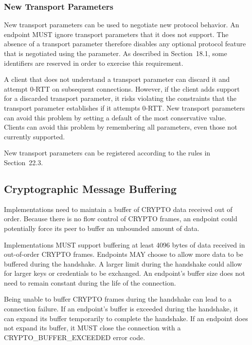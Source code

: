 \documentclass{article}
\begin{document}
\subsubsection{New Transport Parameters}

New transport parameters can be used to negotiate new protocol behavior.  An endpoint MUST ignore transport parameters that it does not support.  The absence of a transport parameter therefore disables any optional protocol feature that is negotiated using the parameter. As described in Section~18.1, some identifiers are reserved in order to exercise this requirement.

A client that does not understand a transport parameter can discard it and attempt 0-RTT on subsequent connections.  However, if the client adds support for a discarded transport parameter, it risks violating the constraints that the transport parameter establishes if it attempts 0-RTT.  New transport parameters can avoid this problem by setting a default of the most conservative value.  Clients can avoid this problem by remembering all parameters, even those not currently supported.

New transport parameters can be registered according to the rules in Section~22.3.

\subsection{Cryptographic Message Buffering}

Implementations need to maintain a buffer of CRYPTO data received out of order.  Because there is no flow control of CRYPTO frames, an endpoint could potentially force its peer to buffer an unbounded amount of data.

Implementations MUST support buffering at least 4096 bytes of data received in out-of-order CRYPTO frames.  Endpoints MAY choose to allow more data to be buffered during the handshake.  A larger limit during the handshake could allow for larger keys or credentials to be exchanged.  An endpoint's buffer size does not need to remain constant during the life of the connection.

Being unable to buffer CRYPTO frames during the handshake can lead to a connection failure.  If an endpoint's buffer is exceeded during the handshake, it can expand its buffer temporarily to complete the handshake.  If an endpoint does not expand its buffer, it MUST close the connection with a CRYPTO\_BUFFER\_EXCEEDED error code.
\end{document}
